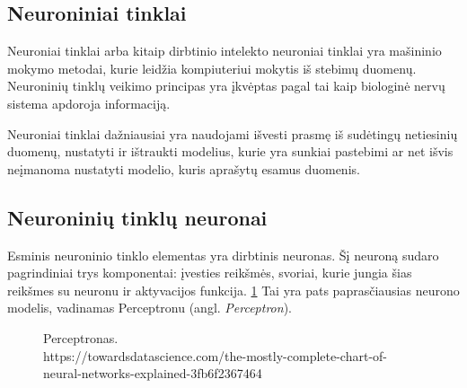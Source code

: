 %
%

\subsection{Neuroniniai tinklai}
Neuroniai tinklai arba kitaip dirbtinio intelekto neuroniai tinklai yra mašininio mokymo metodai, kurie leidžia kompiuteriui mokytis iš stebimų duomenų. Neuroninių tinklų veikimo principas yra įkvėptas pagal tai kaip biologinė nervų sistema apdoroja informaciją.\cite{Sukhadeve2017}

Neuroniai tinklai dažniausiai yra naudojami išvesti prasmę iš sudėtingų netiesinių duomenų, nustatyti ir ištraukti modelius, kurie yra sunkiai pastebimi ar net išvis neįmanoma nustatyti modelio, kuris aprašytų esamus duomenis.\cite{Sukhadeve2017}



\subsection{Neuroninių tinklų neuronai}

Esminis neuroninio tinklo elementas yra dirbtinis neuronas. Šį neuroną sudaro pagrindiniai trys komponentai: įvesties reikšmės, svoriai, kurie jungia šias reikšmes su neuronu ir aktyvacijos funkcija. \ref{fig:perceptron1} Tai yra pats paprasčiausias neurono modelis, vadinamas Perceptronu (angl. \textit{Perceptron}).\cite{Andrew2017}

\begin{figure}[h!]
  \centering
{}
\caption{Perceptronas.\\https://towardsdatascience.com/the-mostly-complete-chart-of-neural-networks-explained-3fb6f2367464}
\label{fig:perceptron1}
\end{figure}

